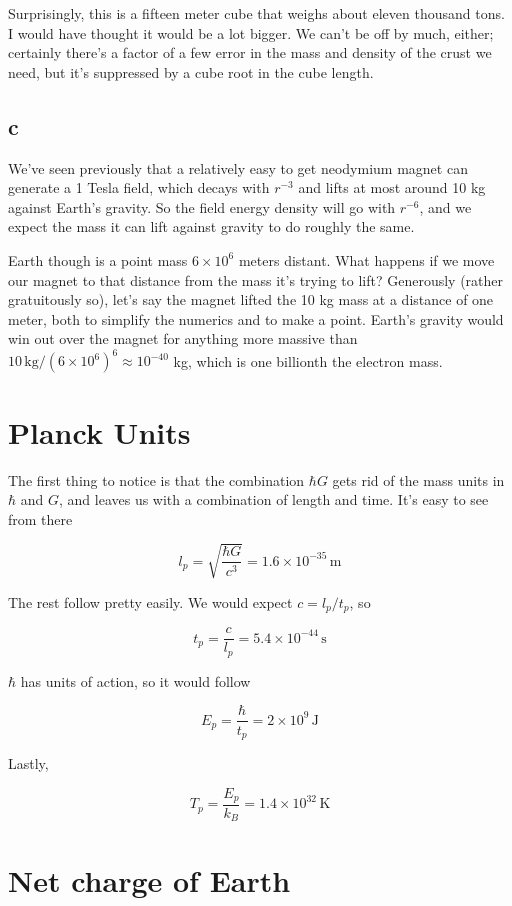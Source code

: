 \documentclass[12pt]{article}
\begin{document}
Surprisingly, this is a fifteen meter cube that weighs about eleven thousand tons. I would have thought it would be a lot bigger. We can't be off by much, either; certainly there's a factor of a few error in the mass and density of the crust we need, but it's suppressed by a cube root in the cube length.

\subsection*{c}

We've seen previously that a relatively easy to get neodymium magnet can generate a 1 Tesla field, which decays with \(r^{-3}\) and lifts at most around 10 kg against Earth's gravity. So the field energy density will go with \(r^{-6}\), and we expect the mass it can lift against gravity to do roughly the same. 

Earth though is a point mass \(6\times 10^6\) meters distant. What happens if we move our magnet to that distance from the mass it's trying to lift? Generously (rather gratuitously so), let's say the magnet lifted the 10 kg mass at a distance of one meter, both to simplify the numerics and to make a point. Earth's gravity would win out over the magnet for anything more massive than \(10 \,\mathrm{kg} / (6\times 10^6)^6 \approx 10^{-40} \) kg, which is one billionth the electron mass.

\section{Planck Units}

The first thing to notice is that the combination \(\hbar G\) gets rid of the mass units in \(\hbar\) and \(G\), and leaves us with a combination of length and time. It's easy to see from there 

\[ l_p = \sqrt{\frac{\hbar G}{c^3}} = 1.6 \times 10^{-35} \,\mathrm{m}
\]

The rest follow pretty easily. We would expect \(c = l_p/t_p\), so 

\[ t_p = \frac{c}{l_p} = 5.4 \times 10^{-44} \, \mathrm{s}
\]

\(\hbar\) has units of action, so it would follow

\[ E_p = \frac{\hbar}{t_p} = 2 \times 10^9 \,\mathrm{J}
\]

Lastly, 

\[ T_p = \frac{E_p}{k_B} = 1.4 \times 10^{32}\,\mathrm{K}
\]


\section{Net charge of Earth}
\end{document}
